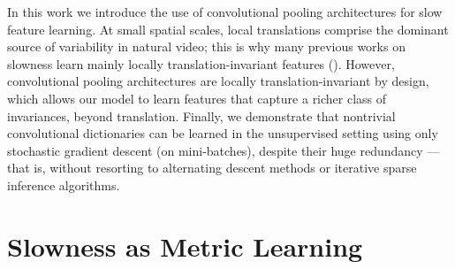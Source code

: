 \documentclass{article} %
\begin{document}
In this work we introduce the use of convolutional pooling architectures for slow feature learning.
At small spatial scales, local translations comprise the dominant source of variability in natural video; this is why many previous works on slowness learn mainly locally translation-invariant features (\cite{SFA,SSA,complexCells}). However, convolutional pooling architectures are locally translation-invariant by design, which allows our model to learn features that capture a richer class of invariances, beyond translation. Finally, we demonstrate that nontrivial convolutional dictionaries can be learned in the unsupervised setting using only stochastic gradient descent (on mini-batches), despite their huge redundancy --- that is, without resorting to alternating descent methods or iterative sparse inference algorithms. 


\section{Slowness as Metric Learning }
\label{sec:slowmetric}
\end{document}
